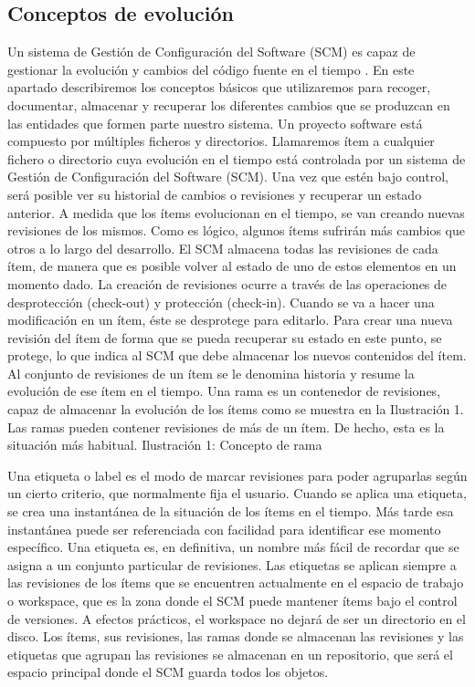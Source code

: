 \subsection{Conceptos de evolución}
Un sistema de Gestión de Configuración del Software (SCM) es capaz de gestionar la evolución y cambios del código fuente en el tiempo \cite{berczuk_software_2002, sommerville_software_2016}.
En este apartado describiremos los conceptos básicos que utilizaremos para recoger, documentar, almacenar y recuperar los diferentes cambios que se produzcan en las entidades que formen parte nuestro sistema.
Un proyecto software está compuesto por múltiples ficheros y directorios. Llamaremos ítem a cualquier fichero o directorio cuya evolución en el tiempo está controlada por un sistema de Gestión de Configuración del Software (SCM). Una vez que estén bajo control, será posible ver su historial de cambios o revisiones y recuperar un estado anterior.
A medida que los ítems evolucionan en el tiempo, se van creando nuevas revisiones de los mismos. Como es lógico, algunos ítems sufrirán más cambios que otros a lo largo del desarrollo. El SCM almacena todas las revisiones de cada ítem, de manera que es posible volver al estado de uno de estos elementos en un momento dado.
La creación de revisiones ocurre a través de las operaciones de desprotección (check-out) y protección (check-in). Cuando se va a hacer una modificación en un ítem, éste se desprotege para editarlo. Para crear una nueva revisión del ítem de forma que se pueda recuperar su estado en este punto, se protege, lo que indica al SCM que debe almacenar los nuevos contenidos del ítem.
Al conjunto de revisiones de un ítem se le denomina historia y resume la evolución de ese ítem en el tiempo.
Una rama es un contenedor de revisiones, capaz de almacenar la evolución de los ítems como se muestra en la Ilustración 1. Las ramas pueden contener revisiones de más de un ítem. De hecho, esta es la situación más habitual.
Ilustración 1: Concepto de rama

Una etiqueta o label es el modo de marcar revisiones para poder agruparlas según un cierto criterio, que normalmente fija el usuario. Cuando se aplica una etiqueta, se crea una instantánea de la situación de los ítems en el tiempo. Más tarde esa instantánea puede ser referenciada con facilidad para identificar ese momento específico. Una etiqueta es, en definitiva, un nombre más fácil de recordar que se asigna a un conjunto particular de revisiones.
Las etiquetas se aplican siempre a las revisiones de los ítems que se encuentren actualmente en el espacio de trabajo o workspace, que es la zona donde el SCM puede mantener ítems bajo el control de versiones. A efectos prácticos, el workspace no dejará de ser un directorio en el disco.
Los ítems, sus revisiones, las ramas donde se almacenan las revisiones y las etiquetas que agrupan las revisiones se almacenan en un repositorio, que será el espacio principal donde el SCM guarda todos los objetos.


